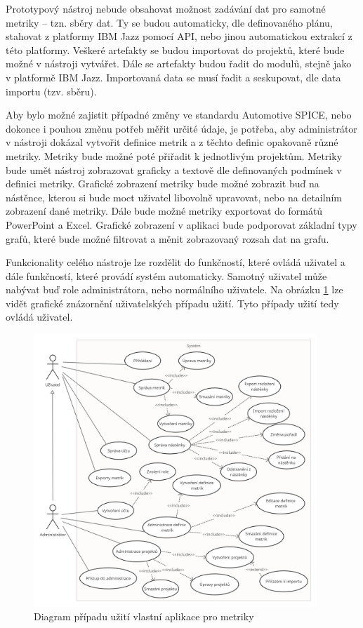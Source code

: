 \documentclass[czech,master]{diploma}
\begin{document}
Prototypový nástroj nebude obsahovat možnost zadávání dat pro samotné metriky -- tzn. sběry dat. Ty se budou automaticky, dle definovaného plánu, stahovat z platformy IBM Jazz pomocí API, nebo jinou automatickou extrakcí z této platformy. Veškeré artefakty se budou importovat do projektů, které bude možné v nástroji vytvářet. Dále se artefakty budou řadit do modulů, stejně jako v platformě IBM Jazz. Importovaná data se musí řadit a seskupovat, dle data importu (tzv. sběru).

Aby bylo možné zajistit případné změny ve standardu Automotive SPICE, nebo dokonce i pouhou změnu potřeb měřit určité údaje, je potřeba, aby administrátor v nástroji dokázal vytvořit definice metrik a z těchto definic opakovaně různé metriky. Metriky bude možné poté přiřadit k jednotlivým projektům. Metriky bude umět nástroj zobrazovat graficky a textově dle definovaných podmínek v definici metriky. Grafické zobrazení metriky bude možné zobrazit buď na nástěnce, kterou si bude moct uživatel libovolně upravovat, nebo na detailním zobrazení dané metriky. Dále bude možné metriky exportovat do formátů PowerPoint a Excel. Grafické zobrazení v aplikaci bude podporovat základní typy grafů, které bude možné filtrovat a měnit zobrazovaný rozsah dat na grafu.

Funkcionality celého nástroje lze rozdělit do funkčností, které ovládá uživatel a dále funkčností, které provádí systém automaticky. Samotný uživatel může nabývat buď role administrátora, nebo normálního uživatele. Na obrázku \ref{fig:jazz_metrics_use_case} lze vidět grafické znázornění uživatelských případu užití. Tyto případy užití tedy ovládá uživatel.

\begin{figure}[!ht]
    \centering
    \includegraphics[width=0.95\textwidth]{Diplomka/Figures/use_case_jazz.png}
    \caption{Diagram případu užití vlastní aplikace pro metriky}
    \label{fig:jazz_metrics_use_case}
\end{figure}
\end{document}
